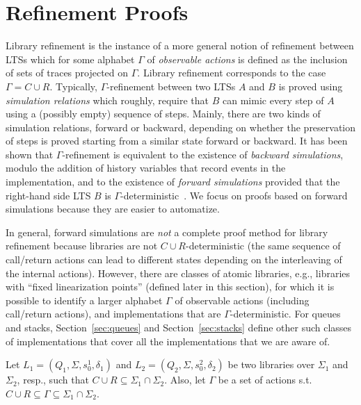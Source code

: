 \vspace{-3.5mm}
\section{Refinement Proofs}
\vspace{-1.5mm}
Library refinement is the instance of a more general notion of refinement between LTSs
which for some alphabet $\Gamma$ of \emph{observable actions} is defined as the inclusion of sets of 
traces projected on $\Gamma$. Library refinement corresponds to the case $\Gamma=C\cup R$. 
Typically, $\Gamma$-refinement between two LTSs $A$ and $B$ is proved using \emph{simulation relations} which roughly, require that 
$B$ can mimic every step of $A$ using a (possibly empty) sequence of steps. Mainly, there are two kinds of simulation
relations, forward or backward, depending on whether the preservation of steps is proved starting from a similar state
forward or backward. It has been shown
that $\Gamma$-refinement is equivalent to the existence of \emph{backward simulations}, modulo the addition of history variables
that record events in the implementation, and to the existence of \emph{forward simulations} provided that the right-hand side
LTS $B$ is $\Gamma$-deterministic~\cite{DBLP:journals/tcs/AbadiL91,DBLP:journals/iandc/LynchV95}. 
We focus on proofs based on forward simulations because they are easier to automatize.


In general, forward simulations are \emph{not} a complete proof method for library refinement because libraries are not 
$C\cup R$-deterministic (the same sequence of call/return actions can lead to different states depending on the interleaving of the internal actions).
However, there are classes of atomic libraries, e.g., libraries with ``fixed linearization points'' (defined later in this section), 
for which it is possible to identify a larger alphabet $\Gamma$ of observable actions (including call/return actions), 
and implementations that are $\Gamma$-deterministic. For queues and stacks, 
Section~\ref{sec:queues} and Section~\ref{sec:stacks} define other such classes of implementations that cover
all the implementations that we are aware of.

Let $L_1=(Q_1,\Sigma, s_0^1, \delta_1)$ and $L_2=(Q_2,\Sigma, s_0^2, \delta_2)$ be two libraries over $\Sigma_1$ and $\Sigma_2$, resp., such that $C\cup R \subseteq \Sigma_1\cap\Sigma_2$. Also, let $\Gamma$ be a set of actions s.t. $C\cup R\subseteq \Gamma\subseteq \Sigma_1\cap\Sigma_2$. 

